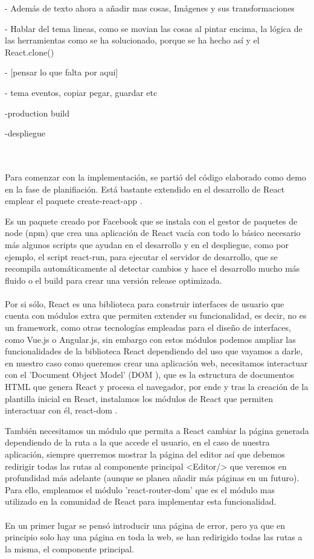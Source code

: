 - Además de texto ahora a añadir mas cosas, Imágenes y sus transformaciones

- Hablar del tema lineas, como se movian las cosas al pintar encima, la lógica de las herramientas
  como se ha solucionado, porque se ha hecho así y el React.clone()

- [pensar lo que falta por aqui]

- tema eventos, copiar pegar, guardar etc

-production build

-despliegue
\\\\\\
\fi

Para comenzar con la implementación, se partió del código elaborado como demo en la 
fase de planifiación.
Está bastante extendido en el desarrollo de React emplear el paquete create-react-app 
\cite{create-react-app}.

Es un paquete creado por Facebook que se instala con el gestor de paquetes de node 
(npm) que crea una aplicación de React vacía con todo lo básico necesario más 
algunos scripts que ayudan en el desarrollo y en el despliegue, como por ejemplo, el 
script react-run, para ejecutar el servidor de desarrollo, que se recompila
automáticamente al detectar cambios y hace el desarrollo mucho más fluido o el build
para crear una versión release optimizada.
\\\\
Por si sólo, React es una biblioteca para construir interfaces de usuario que cuenta con
módulos extra que permiten extender su funcionalidad, es decir, no es un framework, como
otras tecnologías empleadas para el diseño de interfaces, como Vue.js o Angular.js, 
sin embargo con estos módulos podemos ampliar las funcionalidades de la biblioteca React 
dependiendo del uso que vayamos a darle, en nuestro caso como queremos crear una aplicación
web, necesitamos interactuar con el 'Document Object Model' (DOM \cite{DOM}), que es la estructura
de documentos HTML que genera React y procesa el navegador, por ende y tras la creación de 
la plantilla inicial en React, instalamos los módulos de React que permiten interactuar 
con él, react-dom \cite{react-dom}.

También necesitamos un módulo que permita a React cambiar la página generada dependiendo de la 
ruta a la que accede el usuario, en el caso de nuestra aplicación, siempre querremos mostrar 
la página del editor así que debemos redirigir todas las rutas al componente principal <Editor/>
que veremos en profundidad más adelante (aunque se planea añadir más páginas en un futuro).
Para ello, empleamos el módulo 'react-router-dom' \cite{react-router-dom} que es el módulo
mas utilizado en la comunidad de React para implementar esta funcionalidad.
\\\\
\newpage
En un primer lugar se pensó introducir una página de error, pero ya que en principio solo hay una
página en toda la web, se han redirigido todas las rutas a la misma, el componente principal.

